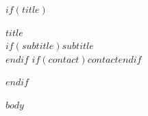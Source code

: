 \documentclass[$if(fontsize)$$fontsize$$else$11pt$endif$]{article}
\begin{document}
$if(title)$
\begin{center}
{\LARGE \textbf{$title$}}\\[2pt]
$if(subtitle)$$subtitle$\\[2pt]$endif$
$if(contact)$$contact$$endif$
\end{center}
\vspace{4pt}
$endif$

$body$
\end{document}
